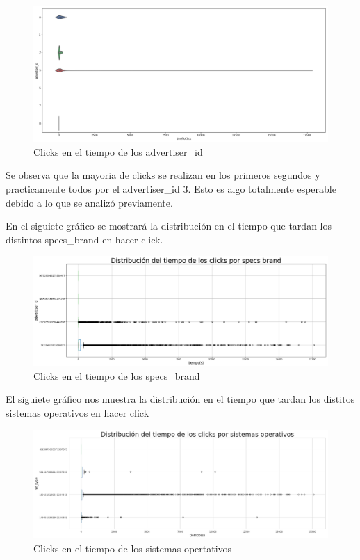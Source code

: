\documentclass[a4paper, 12pt]{article}
\newcommand\tab[1][1cm]{\hspace*{#1}}
\begin{document}
		\FloatBarrier
		\begin{figure}[h]
			\centering
			\includegraphics[width=\textwidth]{images/clicks/clicks_advertiser_id_timeToTouch2.png}
			\caption{Clicks en el tiempo de los advertiser\_id}
		\end{figure}
		\FloatBarrier

		\tab Se observa que la mayoria de clicks se realizan en los primeros segundos y practicamente todos por el advertiser\_id 3. Esto es algo totalmente esperable debido a lo que se analizó previamente.

		\tab En el siguiete gráfico se mostrará la distribución en el tiempo que tardan los distintos specs\_brand en hacer click.

		\FloatBarrier
		\begin{figure}[h]
			\centering
			\includegraphics[width=\textwidth]{images/clicks/clicks_specs_brand_timeToTouch.png}
			\caption{Clicks en el tiempo de los specs\_brand}
		\end{figure}
		\FloatBarrier

		\tab El siguiete gráfico nos muestra la distribución en el tiempo que tardan los distitos sistemas operativos en hacer click

		\FloatBarrier
		\begin{figure}[h]
			\centering
			\includegraphics[width=\textwidth]{images/clicks/clicks_ref_type_timeToTouch.png}
			\caption{Clicks en el tiempo de los sistemas opertativos}
		\end{figure}
		\FloatBarrier
\end{document}
